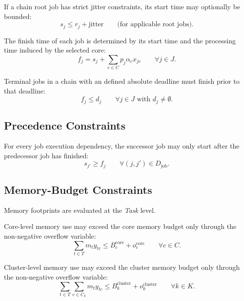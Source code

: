 \documentclass[11pt,a4paper]{article}
\begin{document}
If a chain root job has strict jitter constraints, its start time may optionally be bounded:
\begin{equation}
s_j \leq r_j + \text{jitter}
\qquad \text{(for applicable root jobs)}.
\end{equation}

The finish time of each job is determined by its start time and the processing time induced by the selected core:
\begin{equation}
f_j
=
s_j
+
\sum_{c \in C} p_j \alpha_c x_{jc}
\qquad
\forall j \in J.
\end{equation}

Terminal jobs in a chain with an defined absolute deadline must finish prior to that deadline:
\begin{equation}
f_j \leq d_j
\qquad
\forall j \in J \text{ with } d_j \neq \emptyset.
\end{equation}

\subsection{Precedence Constraints}

For every job execution dependency, the successor job may only start after the predecessor job has finished:
\begin{equation}
s_{j'} \geq f_j
\qquad
\forall (j,j') \in D_{\mathrm{job}}.
\end{equation}

\subsection{Memory-Budget Constraints}

Memory footprints are evaluated at the \emph{Task} level.

Core-level memory use may exceed the core memory budget only through the non-negative overflow variable:
\begin{equation}
\sum_{t \in T} m_t y_{tc}
\leq
B_c^{\mathrm{core}} + o_c^{\mathrm{core}}
\qquad
\forall c \in C.
\end{equation}

Cluster-level memory use may exceed the cluster memory budget only through the non-negative overflow variable:
\begin{equation}
\sum_{t \in T}
\sum_{c \in C_k}
m_t y_{tc}
\leq
B_k^{\mathrm{cluster}} + o_k^{\mathrm{cluster}}
\qquad
\forall k \in K.
\end{equation}
\end{document}
